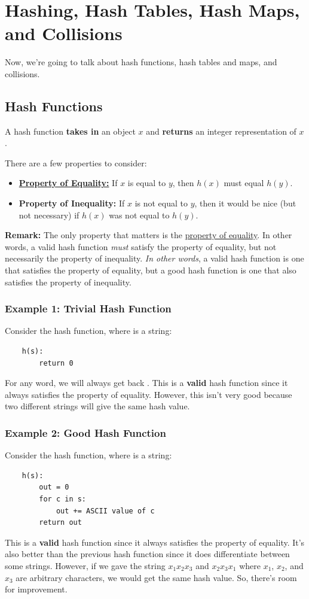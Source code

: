 \documentclass[letterpaper]{article}
\begin{document}
\newpage 
\section{Hashing, Hash Tables, Hash Maps, and Collisions}
Now, we're going to talk about hash functions, hash tables and maps, and collisions.

\subsection{Hash Functions}
A hash function \textbf{takes in} an object $x$ and \textbf{returns} an integer representation of $x$. 

\bigskip

There are a few properties to consider:
\begin{itemize}
    \item \underline{\textbf{Property of Equality:}} If $x$ is equal to $y$, then $h(x)$ must equal $h(y)$.
    \item \textbf{Property of Inequality:} If $x$ is not equal to $y$, then it would be nice (but not necessary) if $h(x)$ was not equal to $h(y)$. 
\end{itemize}
\textbf{Remark:} The only property that matters is the \underline{property of equality}. In other words, a valid hash function \emph{must} satisfy the property of equality, but not necessarily the property of inequality. \emph{In other words}, a valid hash function is one that satisfies the property of equality, but a good hash function is one that also satisfies the property of inequality. 

\subsubsection{Example 1: Trivial Hash Function}
Consider the hash function, where  is a string: 
\begin{verbatim}
    h(s):
        return 0 
\end{verbatim}
For any word, we will always get back . This is a \textbf{valid} hash function since it always satisfies the property of equality. However, this isn't very good because two different strings will give the same hash value. 

\subsubsection{Example 2: Good Hash Function}
Consider the hash function, where  is a string: 
\begin{verbatim}
    h(s):
        out = 0
        for c in s: 
            out += ASCII value of c 
        return out  
\end{verbatim}
This is a \textbf{valid} hash function since it always satisfies the property of equality. It's also better than the previous hash function since it does differentiate between some strings. However, if we gave the string $x_1 x_2 x_3$ and $x_2 x_3 x_1$ where $x_1$, $x_2$, and $x_3$ are arbitrary characters, we would get the same hash value. So, there's room for improvement. 
\end{document}
